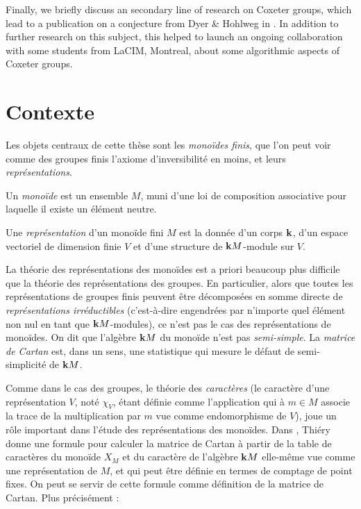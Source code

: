 \documentclass{article}
\begin{document}
	Finally, we briefly discuss an secondary line of research on Coxeter groups, which lead to a publication \cite{Baba2020} on a conjecture from Dyer \& Hohlweg in \cite{dyer2016small}. In addition to further research on this subject, this helped to launch an ongoing collaboration with some students from LaCIM, Montreal, about some algorithmic aspects of Coxeter groups.
	
	\newpage
	
	\section*{Contexte}
	
	Les objets centraux de cette thèse sont les \emph{monoïdes finis}, 
	que l'on peut voir comme des groupes finis l'axiome d'inversibilité 
	en moins, et leurs \emph{représentations}.
	
	\begin{dftn}
		Un \emph{monoïde} est un ensemble $M$, muni d'une loi de 
		composition associative pour laquelle il existe un élément neutre. 

		Une \emph{représentation} d'un monoïde fini $M$ est la donnée d'un
		 corps $\mathbf{k}$, d'un espace vectoriel de dimension finie $V$ et d'une
		  structure de $\mathbf{k} M$-module sur $V$.
	\end{dftn}
	
	La théorie des représentations des monoïdes est a priori beaucoup plus
	difficile que la théorie des représentations des groupes. En particulier, 
	alors que toutes les représentations de groupes finis peuvent être 
	décomposées en somme directe de \emph{représentations irréductibles} 
	(c'est-à-dire engendrées par n'importe quel élément non nul en tant que 
	$\mathbf{k} M$-modules), ce n'est pas le cas des représentations de monoïdes. 
	On dit que l'algèbre $\mathbf{k} M$ du monoïde n'est pas \emph{semi-simple}. 
	La \emph{matrice de Cartan} est, dans un sens, une statistique qui 
	mesure le défaut de semi-simplicité de $\mathbf{k} M$.
	
	Comme dans le cas des groupes, le théorie des \emph{caractères} (le 
	caractère d'une représentation $V$, noté $\chi_V$, étant définie comme 
	l'application qui à $m \in M$ associe la trace de la multiplication par 
	$m$ vue comme endomorphisme de $V$), joue un rôle important dans l'étude 
	des représentations des monoïdes.
	Dans \cite{Thiery.CartanMatrixMonoid}, Thiéry donne une formule pour calculer 
	la matrice de Cartan à partir de la table de caractères du monoïde $X_M$ et 
	du caractère de l'algèbre $\mathbf{k} M$ elle-même vue comme une représentation de 
	$M$, et qui peut être définie en termes de comptage de point fixes. On peut 
	se servir de cette formule comme définition de la matrice de Cartan. Plus 
	précisément :
	
\end{document}
